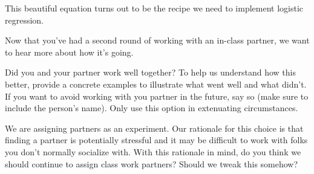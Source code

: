 \documentclass[assignment03_Solutions]{subfiles}
\begin{document}
This beautiful equation turns out to be the recipe we need to implement logistic regression.

\begin{exercise}
Now that you've had a second round of working with an in-class partner, we want to hear more about how it's going.
\bes
\item Did you and your partner work well together?  To help us understand how this better, provide a concrete examples to illustrate what went well and what didn't.  If you want to avoid working with you partner in the future, say so (make sure to include the person's name).  Only use this option in extenuating circumstances.
\item We are assigning partners as an experiment.  Our rationale for this choice is that finding a partner is potentially stressful and it may be difficult to work with folks you don't normally socialize with.  With this rationale in mind, do you think we should continue to assign class work partners?  Should we tweak this somehow?
\ees
\end{exercise}

%
%
%
%
%
%

\end{document}
